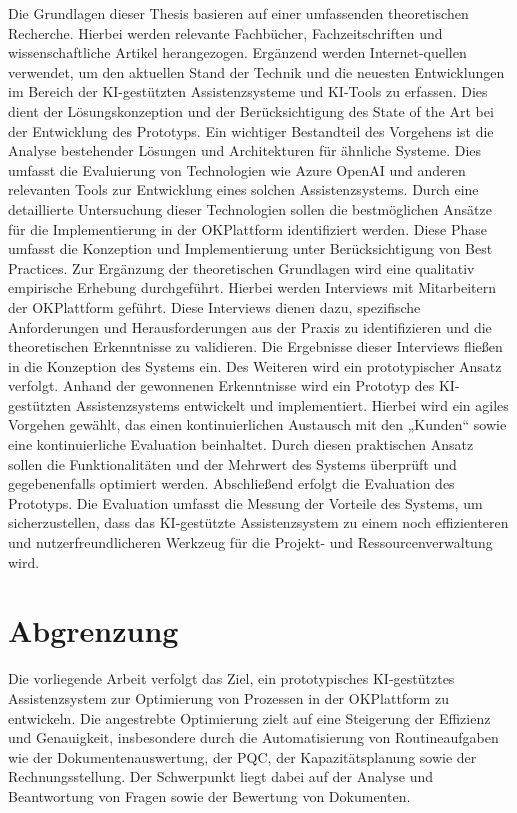 Die Grundlagen dieser Thesis basieren auf einer umfassenden theoretischen Recherche. Hierbei werden 
relevante Fachbücher, Fachzeitschriften und wissenschaftliche Artikel herangezogen. Ergänzend 
werden Internet-quellen verwendet, um den aktuellen Stand der Technik und die neuesten 
Entwicklungen im Bereich der \ac{KI}-gestützten Assistenzsysteme und \ac{KI}-Tools zu erfassen. Dies dient der 
Lösungskonzeption und der Berücksichtigung des State of the Art bei der Entwicklung des 
Prototyps.
Ein wichtiger Bestandteil des Vorgehens ist die Analyse bestehender Lösungen und Architekturen für 
ähnliche Systeme. Dies umfasst die Evaluierung von Technologien wie Azure OpenAI und anderen 
relevanten Tools zur Entwicklung eines solchen Assistenzsystems. Durch eine detaillierte Untersuchung 
dieser Technologien sollen die bestmöglichen Ansätze für die Implementierung in der OKPlattform 
identifiziert werden. Diese Phase umfasst die Konzeption und Implementierung unter Berücksichtigung 
von Best Practices.
Zur Ergänzung der theoretischen Grundlagen wird eine qualitativ empirische Erhebung durchgeführt. 
Hierbei werden Interviews mit Mitarbeitern der OKPlattform geführt. Diese Interviews dienen dazu, 
spezifische Anforderungen und Herausforderungen aus der Praxis zu identifizieren und die 
theoretischen Erkenntnisse zu validieren. Die Ergebnisse dieser Interviews fließen in die Konzeption des 
Systems ein.
Des Weiteren wird ein prototypischer Ansatz verfolgt. Anhand der gewonnenen Erkenntnisse wird ein 
Prototyp des \ac{KI}-gestützten Assistenzsystems entwickelt und implementiert. Hierbei wird ein agiles 
Vorgehen gewählt, das einen kontinuierlichen Austausch mit den „Kunden“ sowie eine kontinuierliche 
Evaluation beinhaltet. Durch diesen praktischen Ansatz sollen die Funktionalitäten und der Mehrwert 
des Systems überprüft und gegebenenfalls optimiert werden.
Abschließend erfolgt die Evaluation des Prototyps. Die Evaluation umfasst die Messung der Vorteile des 
Systems, um sicherzustellen, dass das \ac{KI}-gestützte Assistenzsystem zu einem noch effizienteren und 
nutzerfreundlicheren Werkzeug für die Projekt- und Ressourcenverwaltung wird.

\section{Abgrenzung}

Die vorliegende Arbeit verfolgt das Ziel, ein prototypisches KI-gestütztes Assistenzsystem zur Optimierung von Prozessen in der OKPlattform zu entwickeln. Die angestrebte Optimierung zielt auf eine Steigerung der Effizienz und Genauigkeit, insbesondere durch die Automatisierung von Routineaufgaben wie der Dokumentenauswertung, der \ac{PQC}, der Kapazitätsplanung sowie der Rechnungsstellung. Der Schwerpunkt liegt dabei auf der Analyse und Beantwortung von Fragen sowie der Bewertung von Dokumenten.


